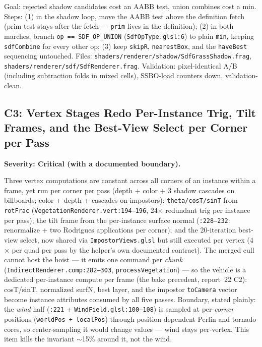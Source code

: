 \documentclass[11pt,a4paper]{article}
\begin{document}
\begin{tcolorbox}[promptbox={Prompt --- C2: AABB-first shadow fetch, union fast path}]
Goal: rejected shadow candidates cost an AABB test, union combines cost a
min. Steps: (1) in the shadow loop, move the AABB test above the definition
fetch (prim test stays after the fetch --- \texttt{prim} lives in the
definition); (2) in both marches, branch \texttt{op == SDF\_OP\_UNION}
(\texttt{SdfOpType.glsl:6}) to plain \texttt{min}, keeping
\texttt{sdfCombine} for every other op; (3) keep \texttt{skipR},
\texttt{nearestBox}, and the \texttt{haveBest} sequencing untouched. Files:
\texttt{shaders/renderer/shadow/SdfGrassShadow.frag},
\texttt{shaders/renderer/sdf/SdfRenderer.frag}. Validation: pixel-identical
A/B (including subtraction folds in mixed cells), SSBO-load counters down,
validation-clean.
\end{tcolorbox}

\subsection{C3: Vertex Stages Redo Per-Instance Trig, Tilt Frames, and the Best-View Select per Corner per Pass}
\label{sec:c3}

\textbf{Severity: Critical (with a documented boundary).}

Three vertex computations are constant across all corners of an instance
within a frame, yet run per corner per pass (depth + color + 3 shadow
cascades on billboards; color + depth + cascades on impostors):
\texttt{theta/cosT/sinT} from \texttt{rotFrac}
(\texttt{VegetationRenderer.vert:194--196}, 24$\times$ redundant trig per
instance per pass); the tilt frame from the per-instance surface normal
(\texttt{:228--232}: renormalize + two Rodrigues applications per corner);
and the 20-iteration best-view select, now shared via
\texttt{ImpostorViews.glsl} but still executed per vertex (4$\times$ per
quad per pass by the helper's own documented contract). The merged cull
cannot host the hoist --- it emits one command per \emph{chunk}
(\texttt{IndirectRenderer.comp:282--303}, \texttt{processVegetation}) ---
so the vehicle is a dedicated per-instance compute per frame (the bake
precedent, report~22 C2): cosT/sinT, normalized surfN, best layer, and the
impostor \texttt{toCamera} vector become instance attributes consumed by
all five passes. Boundary, stated plainly: the \emph{wind} half
(\texttt{:221} + \texttt{WindField.glsl:100--108}) is sampled at
per-\emph{corner} positions (\texttt{worldPos + localPos}) through
position-dependent Perlin and tornado cores, so center-sampling it would
change values --- wind stays per-vertex. This item kills the invariant
$\sim$15\% around it, not the wind.
\end{document}
